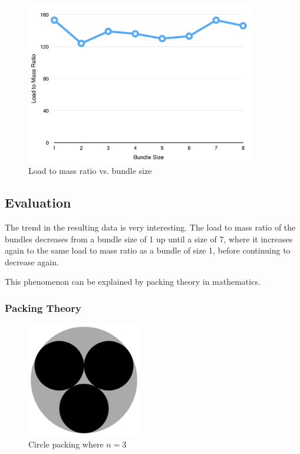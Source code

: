 \documentclass[a4paper,11pt]{article}
\begin{document}
\begin{figure}
\begin{center}
\includegraphics[width=10cm]{figures/bundles.png}
\end{center}
\caption{Load to mass ratio vs. bundle size}
\label{bundles:graph}
\end{figure}



\subsection{Evaluation}

The trend in the resulting data is very interesting. The load to mass ratio of
the bundles decreases from a bundle size of 1 up until a size of 7, where it
increases again to the same load to mass ratio as a bundle of size 1, before
continuing to decrease again.

This phenomenon can be explained by packing theory in mathematics.


\subsubsection{Packing Theory}

\begin{figure}
\begin{center}
\includegraphics[width=5cm]{figures/bundle-3.png}
\end{center}
\caption{Circle packing where $n = 3$}
\label{bundles:bundle-3}
\end{figure}
\end{document}
